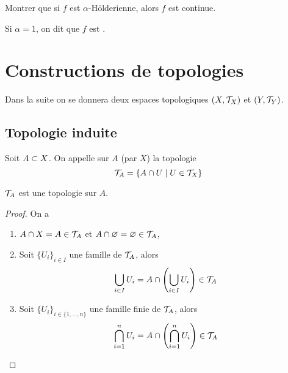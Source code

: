 \begin{exercice}[\(\star\)]
    Montrer que si \(f\) est \(\alpha\)-Hölderienne, alors \(f\) est continue.
\end{exercice}

\begin{remark}
    Si \(\alpha = 1\), on dit que \(f\) est .
\end{remark}

\section{Constructions de topologies}\label{sec:constructions-de-topologies}

Dans la suite on se donnera deux espaces topologiques \((X, \mathcal{T}_X)\) et \((Y, \mathcal{T}_Y)\).

\subsection{Topologie induite}\label{subsec:topologie-induite}
\begin{definition}
    Soit \(A\subset X\). On appelle  sur \(A\) (par \(X\))
    la topologie
    \begin{equation*}
        \mathcal{T}_A = \{A \cap U \mid U \in \mathcal{T}_X\}
    \end{equation*}
\end{definition}

\begin{proposition}
    \(\mathcal{T}_A\) est une topologie sur \(A\).
\end{proposition}

\begin{proof}
    On a
    \begin{enumerate}[label=(\roman*)] %
        \item \(A \cap X = A \in \mathcal{T}_A\) et \(A \cap \varnothing = \varnothing \in \mathcal{T}_A\),
        \item Soit \({\{U_i\}}_{i \in I}\) une famille de \(\mathcal{T}_A\), alors
        \begin{equation*}
            \bigcup_{i \in I} U_i = A \cap \left(\bigcup_{i \in I} U_i\right) \in \mathcal{T}_A
        \end{equation*}
        \item Soit \({\{U_i\}}_{i \in \{1, \ldots, n\}}\) une famille finie de \(\mathcal{T}_A\), alors
        \begin{equation*}
            \bigcap_{i = 1}^n U_i = A \cap \left(\bigcap_{i = 1}^n U_i\right) \in \mathcal{T}_A
        \end{equation*}
    \end{enumerate}
\end{proof}

